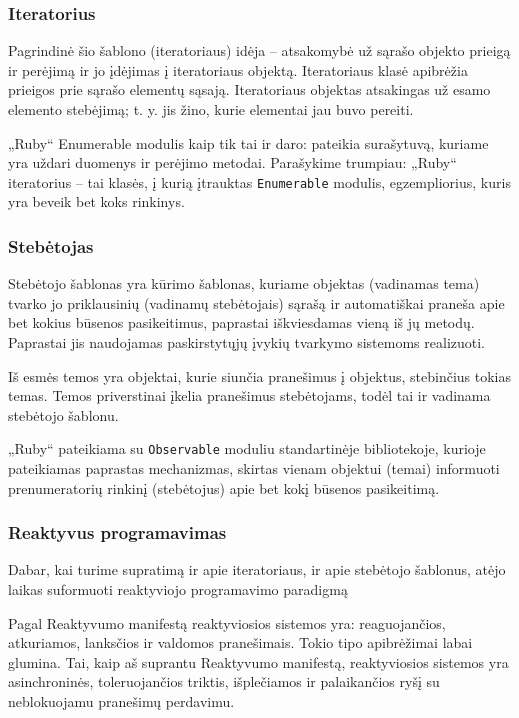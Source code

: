 \subsubsection{Iteratorius}

Pagrindinė šio šablono (iteratoriaus) idėja – atsakomybė už sąrašo objekto prieigą ir perėjimą ir jo įdėjimas į iteratoriaus objektą. Iteratoriaus klasė apibrėžia prieigos prie sąrašo elementų sąsają. Iteratoriaus objektas atsakingas už esamo elemento stebėjimą; t. y. jis žino, kurie elementai jau buvo pereiti.

„Ruby“ Enumerable modulis kaip tik tai ir daro: pateikia surašytuvą, kuriame yra uždari duomenys ir perėjimo metodai. Parašykime trumpiau: „Ruby“ iteratorius – tai klasės, į kurią įtrauktas \lstinline|Enumerable| modulis, egzempliorius, kuris yra beveik bet koks rinkinys.

\subsubsection{Stebėtojas}

Stebėtojo šablonas yra kūrimo šablonas, kuriame objektas (vadinamas tema) tvarko jo priklausinių (vadinamų stebėtojais) sąrašą ir automatiškai praneša apie bet kokius būsenos pasikeitimus, paprastai iškviesdamas vieną iš jų metodų. Paprastai jis naudojamas paskirstytųjų įvykių tvarkymo sistemoms realizuoti.

Iš esmės temos yra objektai, kurie siunčia pranešimus į objektus, stebinčius tokias temas. Temos priverstinai įkelia pranešimus stebėtojams, todėl tai ir vadinama stebėtojo šablonu.

„Ruby“ pateikiama su \lstinline|Observable| moduliu standartinėje bibliotekoje, kurioje pateikiamas paprastas mechanizmas, skirtas vienam objektui (temai) informuoti prenumeratorių rinkinį (stebėtojus) apie bet kokį būsenos pasikeitimą.

\subsubsection{Reaktyvus programavimas}

Dabar, kai turime supratimą ir apie iteratoriaus, ir apie stebėtojo šablonus, atėjo laikas suformuoti reaktyviojo programavimo paradigmą

Pagal Reaktyvumo manifestą reaktyviosios sistemos yra: reaguojančios, atkuriamos, lanksčios ir valdomos pranešimais. Tokio tipo apibrėžimai labai glumina. Tai, kaip aš suprantu Reaktyvumo manifestą, reaktyviosios sistemos yra asinchroninės, toleruojančios triktis, išplečiamos ir palaikančios ryšį su neblokuojamu pranešimų perdavimu.

